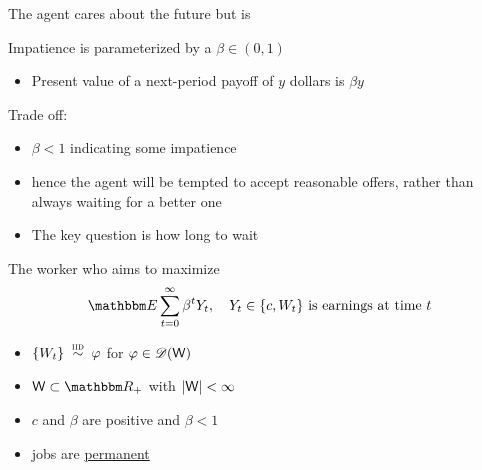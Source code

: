 \begin{frame}

    The agent cares about the future but is 

            \vspace{0.5em}
    Impatience is parameterized by a  $\beta \in (0, 1)$

            \vspace{0.5em}
    \begin{itemize}
        \item Present value of a next-period payoff of $y$ dollars is $\beta y$
    \end{itemize}

            \vspace{0.5em}
            \vspace{0.5em}
    Trade off:
    \begin{itemize}
        \item $\beta < 1$ indicating some impatience
            \vspace{0.5em}
        \item hence the agent will be
            tempted to accept reasonable offers, rather than always waiting
            for a better one
            \vspace{0.5em}
        \item The key question is how long to wait
    \end{itemize}
   
\end{frame}


\begin{frame}
    
    The worker who aims to maximize 
    \begin{equation}
        \EE \sum_{t=0}^{\infty} \beta^t Y_t,
        \quad 
        \text{$Y_t \in \{c, W_t\}$ is earnings at time $t$}
    \end{equation}

        \vspace{0.4em}
    \begin{itemize}
        \item $\{ W_t \} \stackrel{\textrm{ {\sc iid }}} {\sim} \varphi$ for $\varphi \in \mathscr D(\mathsf W)$ 
        \vspace{0.4em}
        \item $\Wsf \subset \RR_+$ with $|\mathsf W| < \infty$
        \vspace{0.4em}
        \item $c$ and $\beta$ are positive and $\beta < 1$
        \vspace{0.4em}
        \item jobs are \underline{permanent} 
    \end{itemize}


\end{frame}


